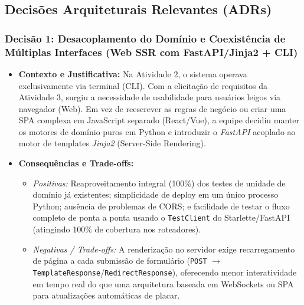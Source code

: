 \documentclass[12pt,a4paper]{article}
\begin{document}
\subsection{Decisões Arquiteturais Relevantes (ADRs)}

\subsubsection*{Decisão 1: Desacoplamento do Domínio e Coexistência de Múltiplas Interfaces (Web SSR com FastAPI/Jinja2 + CLI)}
\begin{itemize}
    \item \textbf{Contexto e Justificativa:} Na Atividade 2, o sistema operava exclusivamente via terminal (CLI). Com a elicitação de requisitos da Atividade 3, surgiu a necessidade de usabilidade para usuários leigos via navegador (Web). Em vez de reescrever as regras de negócio ou criar uma SPA complexa em JavaScript separado (React/Vue), a equipe decidiu manter os motores de domínio puros em Python e introduzir o \textit{FastAPI} acoplado ao motor de templates \textit{Jinja2} (Server-Side Rendering).
    \item \textbf{Consequências e Trade-offs:}
    \begin{itemize}
        \item \textit{Positivas:} Reaproveitamento integral (100\%) dos testes de unidade de domínio já existentes; simplicidade de deploy em um único processo Python; ausência de problemas de CORS; e facilidade de testar o fluxo completo de ponta a ponta usando o \texttt{TestClient} do Starlette/FastAPI (atingindo 100\% de cobertura nos roteadores).
        \item \textit{Negativas / Trade-offs:} A renderização no servidor exige recarregamento de página a cada submissão de formulário (\texttt{POST} $\rightarrow$ \texttt{TemplateResponse}/\texttt{RedirectResponse}), oferecendo menor interatividade em tempo real do que uma arquitetura baseada em WebSockets ou SPA para atualizações automáticas de placar.
    \end{itemize}
\end{itemize}
\end{document}
